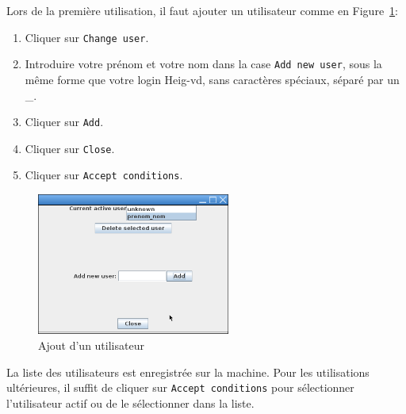 \documentclass[nosolution]{exercice}
\begin{document}
Lors de la première utilisation, il faut ajouter un utilisateur comme en Figure~\ref{fig_logisim_adduser}:
\begin{enumerate}
\item Cliquer sur \texttt{Change user}.

\item Introduire votre prénom et votre nom dans la case \texttt{Add new user}, sous la même forme que votre login Heig-vd, sans caractères spéciaux, séparé par un  \_.

\item Cliquer sur \texttt{Add}.

\item Cliquer sur \texttt{Close}.

\item Cliquer sur \texttt{Accept conditions}.

\end{enumerate}


\begin{figure}[H]
\begin{center}
\includegraphics[width=180pt]{images/add_user.png}
\caption{\label{fig_logisim_adduser}Ajout d'un utilisateur}
\end{center}
\end{figure}

La liste des utilisateurs est enregistrée sur la machine. Pour les utilisations ultérieures, il suffit de cliquer sur \texttt{Accept conditions} pour sélectionner l'utilisateur actif ou de le sélectionner dans la liste.

\end{document}
